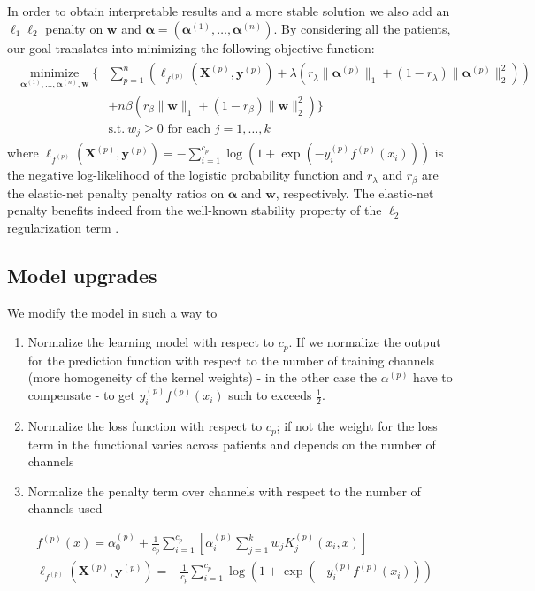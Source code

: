 \documentclass[a4paper]{article}
\DeclareMathOperator{\minimize}{minimize}
\begin{document}
In order to obtain interpretable results and a more stable solution we also add an $\ell_1\ell_2$ penalty on $\bm{w}$ and $\bm \alpha=(\bm{\alpha}^{(1)}, \dots, \bm{\alpha}^{(n)})$.
%
By considering all the patients, our goal translates into minimizing the following objective function:
\begin{align}\label{eq:mkl-multipatient}\begin{split}
\underset{\bm{\alpha}^{(1)}, \dots, \bm{\alpha}^{(n)}, \bm{w}}{\minimize}
\bigg\{& \sum_{p=1}^n  \left( \ell_{f^{(p)}} \left(\bm{X}^{(p)}, \bm{y}^{(p)}\right) + \lambda  (r_\lambda \|\bm{\alpha}^{(p)}\|_1+(1-r_\lambda)\|\bm{\alpha}^{(p)}\|_2^2) \right)\\
& + n\beta \left(r_\beta \|\bm{w}\|_1 + (1-r_\beta)\|\bm{w}\|^2_2\right) \bigg\}\\
& \text{s.t.}\ w_j \geq 0 \text{ for each } j=1,\dots,k
\end{split}\end{align}
%
where $\ell_{f^{(p)}}\left(\bm{X}^{(p)}, \bm{y}^{(p)}\right) = -\sum_{i=1}^{c_p}\log(1 + \exp(-y_i^{(p)}f^{(p)}(x_i)))$ is the negative log-likelihood of the logistic probability function and $r_\lambda$ and $r_\beta$ are the elastic-net penalty penalty ratios on
 $\bm{\alpha}$ and $\bm{w}$, respectively.
The elastic-net penalty benefits indeed from the well-known stability property of the $\ell_2$ regularization term \cite{zou2005regularization}.

\subsection{Model upgrades}
We modify the model in such a way to
\begin{enumerate}
  \item Normalize the learning model with respect to $c_p$. If we normalize the output for the prediction function with respect to the number of training channels (more homogeneity of the kernel weights) - in the other case the $\alpha^{(p)}$ have to compensate - to get $y_i^{(p)} f^{(p)}(x_i)$ such to exceeds $\frac12$.
  \item Normalize the loss function with respect to $c_p$; if not the weight for the loss term in the functional varies across patients and depends on the number of channels
  \item Normalize the penalty term over channels with respect to the number of channels used
\end{enumerate}
\begin{align}
  & f^{(p)}(x) = \alpha^{(p)}_0 + \frac{1}{c_p}\sum_{i = 1}^{c_p}\left[\alpha^{(p)}_i \sum_{j=1}^{k} w_j K^{(p)}_j(x_i, x)\right] \\
  &\ell_{f^{(p)}}\left(\bm{X}^{(p)}, \bm{y}^{(p)}\right) = -\frac{1}{c_p}\sum_{i=1}^{c_p}\log\left(1 + \exp\left(-y_i^{(p)}f^{(p)}(x_i)\right)\right)
\end{align}
\end{document}
